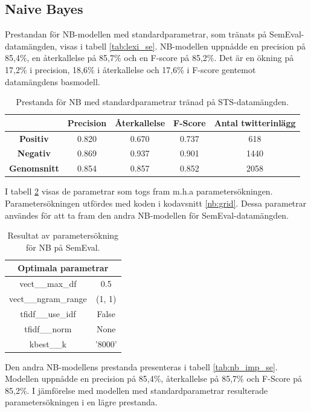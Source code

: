\documentclass{kaumasters} %
\begin{document}
\subsection{Naive Bayes}
Prestandan för NB-modellen med standardparametrar, som tränats på SemEval-datamängden, visas i tabell \ref{tab:lexi_se}. NB-modellen uppnådde en precision på 85,4\%, en återkallelse på 85,7\% och en F-score på 85,2\%. Det är en ökning på 17,2\% i precision, 18,6\% i återkallelse och 17,6\% i F-score gentemot datamängdens basmodell.

\begin{table}[H]
\centering
\caption{Prestanda för NB med standardparametrar tränad på STS-datamängden.}
\label{tab:nb_base_se}
    \begin{tabular}{ccccc}
    \toprule
     & \textbf{Precision} & \textbf{Återkallelse} & \textbf{F-Score} & \textbf{Antal twitterinlägg}  \\
    \midrule
    \textbf{Positiv} & 0.820 & 0.670 & 0.737 & 618 \\
    \textbf{Negativ} & 0.869 & 0.937 & 0.901 & 1440 \\
    \midrule
    \textbf{Genomsnitt} & 0.854 & 0.857 & 0.852  & 2058 \\
    \bottomrule
\end{tabular}
\end{table}

I tabell \ref{tab:nb_grid_se} visas de parametrar som togs fram m.h.a parametersökningen. Parametersökningen utfördes med koden i kodavsnitt \ref{nb:grid}. Dessa parametrar användes för att ta fram den andra NB-modellen för SemEval-datamängden.

\begin{table}[H]
\centering
\caption{Resultat av parametersökning för NB på SemEval.}
\label{tab:nb_grid_se}
    \begin{tabular}{cc}
    \toprule
    \multicolumn{2}{c}{\textbf{Optimala parametrar}} \\
    \midrule
    vect\_\_max\_df & 0.5  \\
    vect\_\_ngram\_range & (1, 1)  \\
    tfidf\_\_use\_idf & False  \\
    tfidf\_\_norm & None  \\
    kbest\_\_k & '8000' \\
    \bottomrule
\end{tabular}
\end{table}

Den andra NB-modellens prestanda presenteras i tabell \ref{tab:nb_imp_se}. Modellen uppnådde en precision på 85,4\%, återkallelse på 85,7\% och F-Score på 85,2\%. I jämförelse med modellen med standardparametrar resulterade parametersökningen i en lägre prestanda.  
\end{document}
